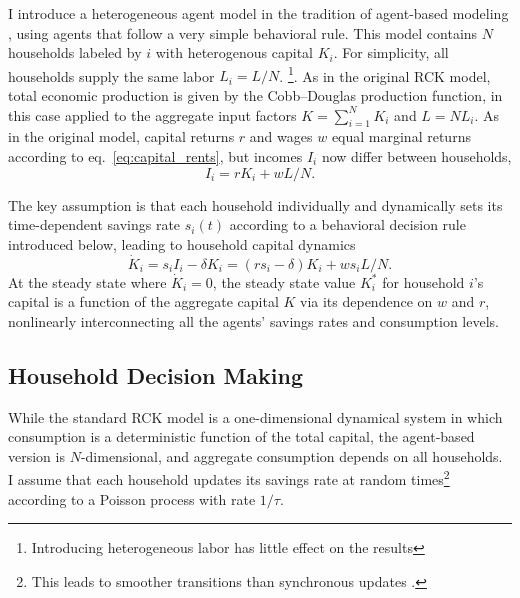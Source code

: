 I introduce a heterogeneous agent model in the tradition of agent-based modeling \citep{LeBaron1999,Berry2002,Epstein2006,Dosi2010, Dawid2014,Hommes2018,Simon2018},
using agents that follow a very simple behavioral rule.  
This model contains $N$ households labeled by $i$ with heterogenous capital $K_i$. For simplicity, all households supply the same labor $L_i = L/N$.  \footnote{Introducing heterogeneous labor has little effect on the results}.
As in the original RCK model, total economic production is given by the Cobb--Douglas production function, in this case applied to the aggregate input factors $K = \sum_{i=1}^N K_i$ and $L = N L_i$.
As in the original model, capital returns $r$ and wages $w$ equal marginal returns according to eq.~\eqref{eq:capital_rents},
but incomes $I_i$ now differ between households,
\begin{equation}
\label{eq:Ii}
	I_i = r K_i + w L/N.
\end{equation}

The key assumption is that each household individually and dynamically sets its time-dependent savings rate $s_i(t)$ according to a behavioral decision rule introduced below,
leading to household capital dynamics
\begin{equation}
	\dot{K}_i = s_i I_i - \delta K_i = (r s_i - \delta) K_i + w s_i L/N.
        \label{eq:rcka_kdot}
\end{equation}
At the steady state where $\dot{K}_i = 0$, the steady state value $K_i^*$ for household $i$'s capital is a function of the aggregate capital $K$ via its dependence on $w$ and $r$, 
nonlinearly interconnecting all the agents' savings rates and consumption levels.

\subsection{Household Decision Making}
While the standard RCK model is a one-dimensional dynamical system in which consumption is a deterministic function of the total capital, the agent-based version is $N$-dimensional, and aggregate consumption depends on all households.
I assume that each household updates its savings rate at random times\footnote{
%
This leads to smoother transitions than synchronous updates \citep{Vizzari2005, Fates2010}.
}
%
according to a Poisson process with rate $1/\tau$.

